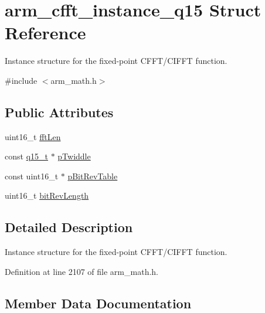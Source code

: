 \hypertarget{structarm__cfft__instance__q15}{}\section{arm\+\_\+cfft\+\_\+instance\+\_\+q15 Struct Reference}
\label{structarm__cfft__instance__q15}


Instance structure for the fixed-\/point C\+F\+F\+T/\+C\+I\+F\+FT function.  




{\ttfamily \#include $<$arm\+\_\+math.\+h$>$}

\subsection*{Public Attributes}
\begin{DoxyCompactItemize}
\item 
uint16\+\_\+t \hyperlink{structarm__cfft__instance__q15_a5f9e1d3a8c127ee323b5e6929aeb90df}{fft\+Len}
\item 
const \hyperlink{arm__math_8h_ab5a8fb21a5b3b983d5f54f31614052ea}{q15\+\_\+t} $\ast$ \hyperlink{structarm__cfft__instance__q15_afdaf12ce4687cec021c5ae73d0987a3f}{p\+Twiddle}
\item 
const uint16\+\_\+t $\ast$ \hyperlink{structarm__cfft__instance__q15_ac9160b80243b99a0b6e2f75ddb5cf0ae}{p\+Bit\+Rev\+Table}
\item 
uint16\+\_\+t \hyperlink{structarm__cfft__instance__q15_a738907cf34bdbbaf724414ac2decbc3c}{bit\+Rev\+Length}
\end{DoxyCompactItemize}


\subsection{Detailed Description}
Instance structure for the fixed-\/point C\+F\+F\+T/\+C\+I\+F\+FT function. 

Definition at line 2107 of file arm\+\_\+math.\+h.



\subsection{Member Data Documentation}
\mbox{\label{structarm__cfft__instance__q15_a738907cf34bdbbaf724414ac2decbc3c}} 
